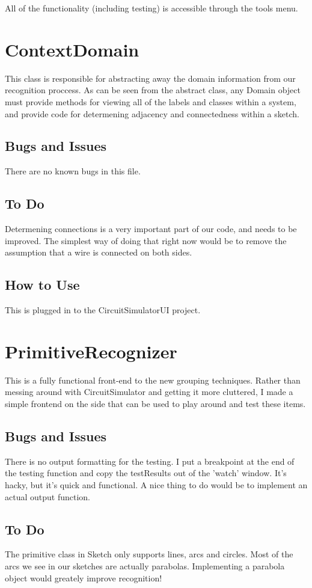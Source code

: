 \documentclass{article}
\begin{document}
All of the functionality (including testing) is accessible through the tools menu.
\section{ContextDomain}
This class is responsible for abstracting away the domain information from our recognition proccess. As can be seen from the abstract class, any Domain object must provide methods for viewing all of the labels and classes within a system, and provide code for determening adjacency and connectedness within a sketch.
\subsection{Bugs and Issues}
There are no known bugs in this file.
\subsection{To Do}
Determening connections is a very important part of our code, and needs to be improved. The simplest way of doing that right now would be to remove the assumption that a wire is connected on both sides.
\subsection{How to Use}
This is plugged in to the CircuitSimulatorUI project.
\section{PrimitiveRecognizer}
This is a fully functional front-end to the new grouping techniques. Rather than messing around with CircuitSimulator and getting it more cluttered, I made a simple frontend on the side that can be used to play around and test these items.
\subsection{Bugs and Issues}
There is no output formatting for the testing. I put a breakpoint at the end of the testing function and copy the testResults out of the 'watch' window. It's hacky, but it's quick and functional. A nice thing to do would be to implement an actual output function.
\subsection{To Do}
The primitive class in Sketch only supports lines, arcs and circles. Most of the arcs we see in our sketches are actually parabolas. Implementing a parabola object would greately improve recognition!
\end{document}
